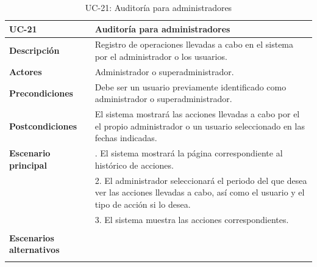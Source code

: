 \begin{table}
  \begin{center}
    \begin{tabularx}{16.4cm}{|l|X|}
      \hline
      \textbf{UC-21} & \textbf{Auditoría para administradores}\\
      \hline
      \textbf{Descripción} & Registro de operaciones llevadas a cabo en el sistema por el administrador o los usuarios.\\
      \hline
      \textbf{Actores} & Administrador o superadministrador.\\
      \hline
      \textbf{Precondiciones} & Debe ser un usuario previamente identificado como administrador o superadministrador.\\
      \hline
      \textbf{Postcondiciones} & El sistema mostrará las acciones llevadas a cabo por el el propio administrador o un usuario seleccionado en las fechas indicadas.\\
      \hline
      \textbf{Escenario principal} & \smallskip 1. El sistema mostrará la página correspondiente al histórico de acciones.\\
      & 2. El administrador seleccionará el periodo del que desea ver las acciones llevadas a cabo, así como el usuario y el tipo de acción si lo desea.\\
      & 3. El sistema muestra las acciones correspondientes.\\
      & \\
      \hline
      \textbf{Escenarios alternativos} & \\
      & \\
      \hline
    \end{tabularx}
    \caption{UC-21: Auditoría para administradores}
    \label{tab:CU-auditorias-admin}
  \end{center}
\end{table}


